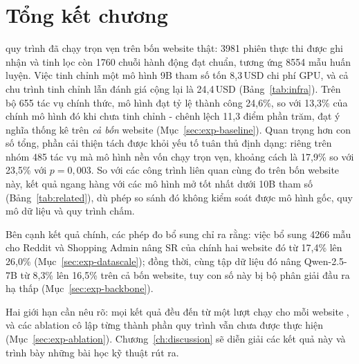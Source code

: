 \section{Tổng kết chương}
\label{sec:exp-summary}

quy trình đã chạy trọn vẹn trên bốn website thật: 3981 phiên thực thi được ghi nhận và tinh lọc còn 1760 chuỗi hành động đạt chuẩn, tương ứng 8554 mẫu huấn luyện. Việc tinh chỉnh một mô hình 9B tham số tốn 8{,}3\,USD chi phí GPU, và cả chu trình tinh chỉnh lẫn đánh giá cộng lại là 24{,}4\,USD (Bảng~\ref{tab:infra}). Trên bộ 655 tác vụ chính thức, mô hình đạt tỷ lệ thành công 24{,}6\%, so với 13{,}3\% của chính mô hình đó khi chưa tinh chỉnh - chênh lệch 11{,}3 điểm phần trăm, đạt ý nghĩa thống kê trên \emph{cả bốn} website (Mục~\ref{sec:exp-baseline}). Quan trọng hơn con số tổng, phần cải thiện tách được khỏi yếu tố tuân thủ định dạng: riêng trên nhóm 485 tác vụ mà mô hình nền vốn chạy trọn vẹn, khoảng cách là 17{,}9\% so với 23{,}5\% với $p = 0{,}003$. So với các công trình liên quan cùng đo trên bốn website này, kết quả ngang hàng với các mô hình mở tốt nhất dưới 10B tham số (Bảng~\ref{tab:related}), dù phép so sánh đó không kiểm soát được mô hình gốc, quy mô dữ liệu và quy trình chấm.

Bên cạnh kết quả chính, các phép đo bổ sung chỉ ra rằng: việc bổ sung 4266 mẫu cho Reddit và Shopping Admin nâng SR của chính hai website đó từ 17{,}4\% lên 26{,}0\% (Mục~\ref{sec:exp-datascale}); đồng thời, cùng tập dữ liệu đó nâng Qwen-2.5-7B từ 8{,}3\% lên 16{,}5\% trên cả bốn website, tuy con số này bị bộ phân giải đầu ra hạ thấp (Mục~\ref{sec:exp-backbone}).

Hai giới hạn cần nêu rõ: mọi kết quả đều đến từ một lượt chạy cho mỗi website , và các ablation cô lập từng thành phần quy trình vẫn chưa được thực hiện (Mục~\ref{sec:exp-ablation}). Chương~\ref{ch:discussion} sẽ diễn giải các kết quả này và trình bày những bài học kỹ thuật rút ra.
